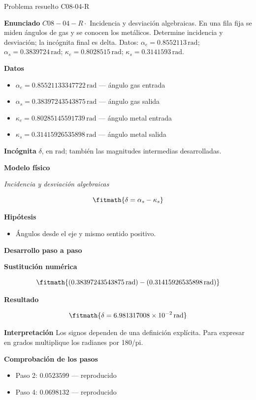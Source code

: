 \documentclass[10pt,openany]{book}
\begin{document}
\begin{studiumworked}{Problema resuelto C08-04-R}


\noindent\textbf{Enunciado}
\(C08-04-R \cdot\) Incidencia y desviación algebraicas. En una fila fija se miden ángulos de gas y se conocen los metálicos. Determine incidencia y desviación; la incógnita final es delta. Datos: \(\alpha_e=0.8552113\, \mathrm{rad}\); \(\alpha_s=0.3839724\, \mathrm{rad}\); \(\kappa_e=0.8028515\, \mathrm{rad}\); \(\kappa_s=0.3141593\, \mathrm{rad}\).

\noindent\textbf{Datos}
\begin{itemize}
\item $\alpha_e = 0.85521133347722\,\mathrm{rad}$ — ángulo gas entrada
\item $\alpha_s = 0.38397243543875\,\mathrm{rad}$ — ángulo gas salida
\item $\kappa_e = 0.80285145591739\,\mathrm{rad}$ — ángulo metal entrada
\item $\kappa_s = 0.31415926535898\,\mathrm{rad}$ — ángulo metal salida
\end{itemize}

\noindent\textbf{Incógnita}
$\delta$, en $\mathrm{rad}$; también las magnitudes intermedias desarrolladas.

\noindent\textbf{Modelo físico}

\noindent\textit{Incidencia y desviación algebraicas}

\[
\fitmath{\delta=\alpha_s - \kappa_s}
\]

\noindent\textbf{Hipótesis}
\begin{itemize}
\item Ángulos desde el eje y mismo sentido positivo.
\end{itemize}

\noindent\textbf{Desarrollo paso a paso}



\noindent\textbf{Sustitución numérica}

\[
\fitmath{\left(0.38397243543875\,\mathrm{rad}\right) - \left(0.31415926535898\,\mathrm{rad}\right)}
\]

\noindent\textbf{Resultado}

\[
\fitmath{\delta=6.981317008\times10^{-2}\,\mathrm{rad}}
\]

\noindent\textbf{Interpretación}
Los signos dependen de una definición explícita. Para expresar en grados multiplique los radianes por 180/pi.

\noindent\textbf{Comprobación de los pasos}
\begin{itemize}
\item Paso 2: $0.0523599$ — reproducido
\item Paso 4: $0.0698132$ — reproducido
\end{itemize}


\end{studiumworked}
\end{document}
